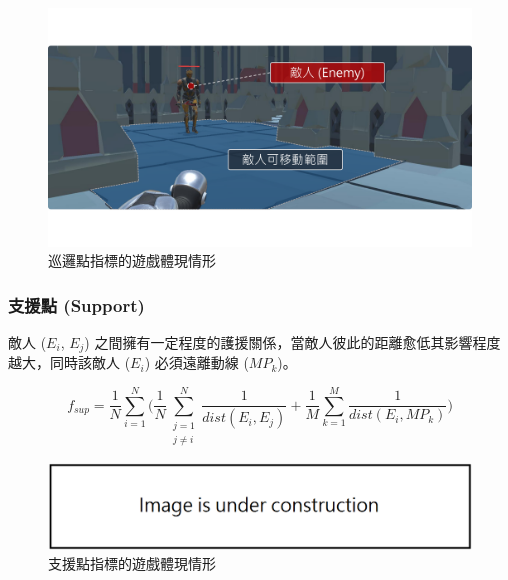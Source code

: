 \begin{figure}[!htb]
  \begin{center}
    \includegraphics[width=1.0\textwidth]{figures/fitnesses-patrol-gameplay.pdf}
    \caption{巡邏點指標的遊戲體現情形}
    \label{fig:fitnesses-patrol-gameplay}
  \end{center}
\end{figure}

\subsubsection{支援點 (Support)}
\label{sssec:method-segments-fitnesses-support}

敵人 ($E_{i}$, $E_{j}$) 之間擁有一定程度的護援關係，當敵人彼此的距離愈低其影響程度越大，同時該敵人 ($E_{i}$) 必須遠離動線 ($MP_{k}$)。

\begin{equation}
f_{sup}=\frac{1}{N} \sum_{i=1}^{N} \bigg( \frac{1}{N} \sum_{\substack{j=1 \\ j \neq i}}^{N} \frac{1}{dist(E_{i}, E_{j})} + \frac{1}{M} \sum_{k=1}^{M} \frac{1}{dist(E_{i}, MP_{k})} \bigg)
\end{equation}

\begin{figure}[!htb]
  \begin{center}
    \includegraphics[width=1.0\textwidth]{figures/under_construction.png}
    \caption{支援點指標的遊戲體現情形}
    \label{fig:fitnesses-support-gameplay}
  \end{center}
\end{figure}

